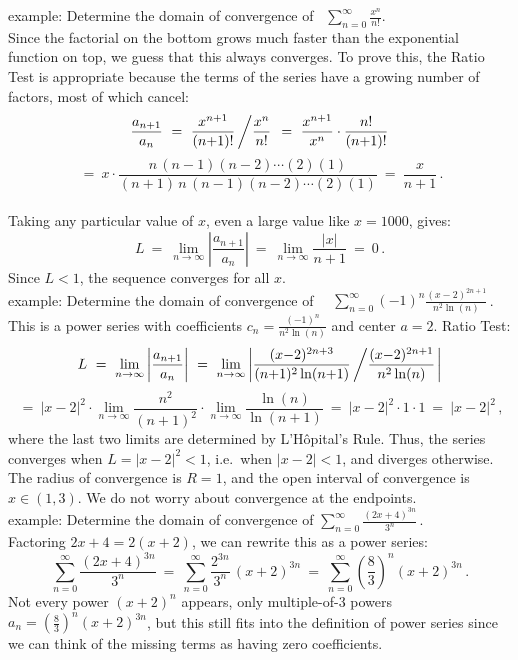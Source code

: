 \documentclass[11pt]{article}
\newcommand{\ds}{\displaystyle}
\begin{document}
\noindent
{\sc example:} Determine the domain of convergence of 
\ $\ds\sum_{n=0}^\infty \frac{x^n}{n!}$.
\\
Since the factorial on the bottom grows much faster than the 
exponential function on top, we guess that this always converges.
To prove this, the Ratio Test is appropriate because the terms of the
series have a growing number of factors, most of which 
cancel:
$$
\frac{a_{n+1}}{a_n}
\ =\ 
\frac{x^{n+1}}{(n{+}1)!}\left/\frac{x^n}{n!}\right.
\ =\
\frac{x^{n+1}}{x^n}\cdot
\frac{n!}{(n{+}1)!} 
$$
$$
\ =\ 
x \cdot
\frac{n\,(n{-}1)(n{-}2)\cdots (2)(1)}
{(n{+}1)\,n\,(n{-}1)(n{-}2)\cdots (2)(1)}
\ =\
\frac{x}{n{+}1}\,.
$$
\\[0em]
Taking any particular value of $x$, even a large value like $x=1000$,
gives: 
$$
L\ =\ \lim\limits_{n\to\infty}\left|\frac{a_{n+1}}{a_n}\right| 
\ =\  \lim\limits_{n\to\infty}\frac{|x|}{n{+}1} \ =\  0\,.
$$
Since $L <1$, the sequence converges for all $x$.
\\[.5em]
{\sc example:} Determine the domain of convergence of \ \
$\ds\sum_{n=0}^\infty (-1)^n\frac{(x{-}2)^{2n+1}}{n^2\ln(n)}$\,.
\\
This is a power series with coefficients $c_n=\frac{(-1)^n}{n^2\ln(n)}$
and center $a=2$. Ratio Test:
$$
L\ =\ 
\lim_{n\to\infty}
\left|\frac{a_{n+1}}{a_n}\right|
\ =\ 
\lim_{n\to\infty}\left|
\frac{(x{-}2)^{2n+3}}{(n{+}1)^2\ln(n{+}1)}\left/
\frac{(x{-}2)^{2n+1}}{n^2\ln(n)}\right.\right|
$$
$$
\ =\
|x{-}2|^2\cdot\lim_{n\to\infty}
\frac{n^2}{(n{+}1)^2}
\cdot
\lim_{n\to\infty}\frac{\ln(n)}{\ln(n{+}1)}
\ =\ |x{-}2|^2\cdot 1\cdot 1 \ =\ |x{-}2|^2\,,
$$
where the last two limits are determined by L'H\^opital's Rule.
Thus, the series converges when $L = |x{-}2|^2 <1$, i.e.~when $|x{-}2|<1$,
and diverges otherwise.
The radius of convergence is $R=1$, and the open interval of convergence
is $x\in(1,3)$. We do not worry about convergence at the endpoints.
\\[.5em]
{\sc example:} Determine the domain of convergence of 
$\ds\sum_{n=0}^\infty \frac{(2x{+}4)^{3n}}{3^n}$\,.
\\
Factoring $2x{+}4=2(x{+}2)$, we can rewrite this as a power series:
$$
\sum_{n=0}^\infty \frac{(2x{+}4)^{3n}}{3^n}
\ =\
\sum_{n=0}^\infty 
\frac{2^{3n}}{3^n}\, (x{+}2)^{3n}
\ =\
\sum_{n=0}^\infty 
\left(\frac{8}{3}\right)^{\!\!n}\! (x{+}2)^{3n}
\,.
$$
Not every power $(x{+}2)^n$ appears, only multiple-of-3 powers $
a_n=(\frac83)^n(x{+}2)^{3n}$,
but this still fits into the definition of power series since
we can think of the missing terms as having zero coefficients.
\end{document}
